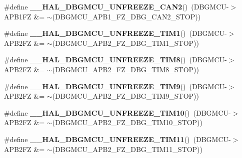 \begin{DoxyCompactItemize}
\item 
\#define {\bfseries \+\_\+\+\_\+\+H\+A\+L\+\_\+\+D\+B\+G\+M\+C\+U\+\_\+\+U\+N\+F\+R\+E\+E\+Z\+E\+\_\+\+C\+A\+N2}()~(D\+B\+G\+M\+CU-\/$>$A\+P\+B1\+FZ \&= $\sim$(D\+B\+G\+M\+C\+U\+\_\+\+A\+P\+B1\+\_\+\+F\+Z\+\_\+\+D\+B\+G\+\_\+\+C\+A\+N2\+\_\+\+S\+T\+OP))\hypertarget{group___h_a_l___exported___macros_ga10fd523f4709571f091465b8d58ad385}{}\label{group___h_a_l___exported___macros_ga10fd523f4709571f091465b8d58ad385}

\item 
\#define {\bfseries \+\_\+\+\_\+\+H\+A\+L\+\_\+\+D\+B\+G\+M\+C\+U\+\_\+\+U\+N\+F\+R\+E\+E\+Z\+E\+\_\+\+T\+I\+M1}()~(D\+B\+G\+M\+CU-\/$>$A\+P\+B2\+FZ \&= $\sim$(D\+B\+G\+M\+C\+U\+\_\+\+A\+P\+B2\+\_\+\+F\+Z\+\_\+\+D\+B\+G\+\_\+\+T\+I\+M1\+\_\+\+S\+T\+OP))\hypertarget{group___h_a_l___exported___macros_ga2f91eec9f9a424ab611be0e770c6692e}{}\label{group___h_a_l___exported___macros_ga2f91eec9f9a424ab611be0e770c6692e}

\item 
\#define {\bfseries \+\_\+\+\_\+\+H\+A\+L\+\_\+\+D\+B\+G\+M\+C\+U\+\_\+\+U\+N\+F\+R\+E\+E\+Z\+E\+\_\+\+T\+I\+M8}()~(D\+B\+G\+M\+CU-\/$>$A\+P\+B2\+FZ \&= $\sim$(D\+B\+G\+M\+C\+U\+\_\+\+A\+P\+B2\+\_\+\+F\+Z\+\_\+\+D\+B\+G\+\_\+\+T\+I\+M8\+\_\+\+S\+T\+OP))\hypertarget{group___h_a_l___exported___macros_ga7375cef18047e43c68f6bd871de40f1a}{}\label{group___h_a_l___exported___macros_ga7375cef18047e43c68f6bd871de40f1a}

\item 
\#define {\bfseries \+\_\+\+\_\+\+H\+A\+L\+\_\+\+D\+B\+G\+M\+C\+U\+\_\+\+U\+N\+F\+R\+E\+E\+Z\+E\+\_\+\+T\+I\+M9}()~(D\+B\+G\+M\+CU-\/$>$A\+P\+B2\+FZ \&= $\sim$(D\+B\+G\+M\+C\+U\+\_\+\+A\+P\+B2\+\_\+\+F\+Z\+\_\+\+D\+B\+G\+\_\+\+T\+I\+M9\+\_\+\+S\+T\+OP))\hypertarget{group___h_a_l___exported___macros_ga3c336afea7d87b769cee4fb059ed2477}{}\label{group___h_a_l___exported___macros_ga3c336afea7d87b769cee4fb059ed2477}

\item 
\#define {\bfseries \+\_\+\+\_\+\+H\+A\+L\+\_\+\+D\+B\+G\+M\+C\+U\+\_\+\+U\+N\+F\+R\+E\+E\+Z\+E\+\_\+\+T\+I\+M10}()~(D\+B\+G\+M\+CU-\/$>$A\+P\+B2\+FZ \&= $\sim$(D\+B\+G\+M\+C\+U\+\_\+\+A\+P\+B2\+\_\+\+F\+Z\+\_\+\+D\+B\+G\+\_\+\+T\+I\+M10\+\_\+\+S\+T\+OP))\hypertarget{group___h_a_l___exported___macros_gaa63c03a742fa4728b49077514189b318}{}\label{group___h_a_l___exported___macros_gaa63c03a742fa4728b49077514189b318}

\item 
\#define {\bfseries \+\_\+\+\_\+\+H\+A\+L\+\_\+\+D\+B\+G\+M\+C\+U\+\_\+\+U\+N\+F\+R\+E\+E\+Z\+E\+\_\+\+T\+I\+M11}()~(D\+B\+G\+M\+CU-\/$>$A\+P\+B2\+FZ \&= $\sim$(D\+B\+G\+M\+C\+U\+\_\+\+A\+P\+B2\+\_\+\+F\+Z\+\_\+\+D\+B\+G\+\_\+\+T\+I\+M11\+\_\+\+S\+T\+OP))\hypertarget{group___h_a_l___exported___macros_gae6396470b3bddff9424201bf07573f19}{}\label{group___h_a_l___exported___macros_gae6396470b3bddff9424201bf07573f19}


\end{DoxyCompactItemize}
